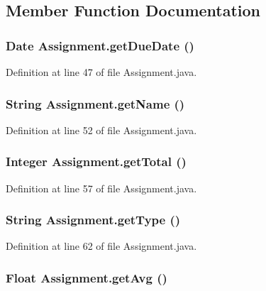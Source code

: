 \subsection{Member Function Documentation}
\hypertarget{classAssignment_675ad345db48da4e5c76ef8ca6a1d542}{
\subsubsection{\setlength{\rightskip}{0pt plus 5cm}Date Assignment.getDueDate ()}}
\label{classAssignment_675ad345db48da4e5c76ef8ca6a1d542}




Definition at line 47 of file Assignment.java.\hypertarget{classAssignment_abdd9b24e2bdbe8e0c6001b82656f7a1}{
\subsubsection{\setlength{\rightskip}{0pt plus 5cm}String Assignment.getName ()}}
\label{classAssignment_abdd9b24e2bdbe8e0c6001b82656f7a1}




Definition at line 52 of file Assignment.java.\hypertarget{classAssignment_3ba879ed33555292e38132d0cc7eae72}{
\subsubsection{\setlength{\rightskip}{0pt plus 5cm}Integer Assignment.getTotal ()}}
\label{classAssignment_3ba879ed33555292e38132d0cc7eae72}




Definition at line 57 of file Assignment.java.\hypertarget{classAssignment_68847634255250ce3661e8bcfed61962}{
\subsubsection{\setlength{\rightskip}{0pt plus 5cm}String Assignment.getType ()}}
\label{classAssignment_68847634255250ce3661e8bcfed61962}




Definition at line 62 of file Assignment.java.\hypertarget{classAssignment_683f502f320a2d8b4eaff671099759b8}{
\subsubsection{\setlength{\rightskip}{0pt plus 5cm}Float Assignment.getAvg ()}}
\label{classAssignment_683f502f320a2d8b4eaff671099759b8}




